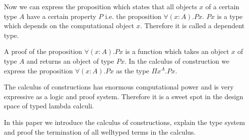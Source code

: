 \begin{enumerate}
Now we can express the proposition which states that all objects $x$ of a
certain type $A$ have a certain property $P$ i.e. the proposition $\forall
(x:A). P x$. $P x$ is a type which depends on the computational object $x$.
Therefore it is called a dependent type.

A proof of the proposition $\forall (x: A). P x$ is a function which takes an
object $x$ of type $A$ and returns an object of type $P x$. In the calculus of
construction we express the proposition $\forall (x: A). P x$ as the type $\Pi
x^A. P x$.
\end{enumerate}


The calculus of constructions has enormous computational power and is very
expressive as a logic and proof system. Therefore it is a sweet spot in the
design space of typed lambda calculi.

In this paper we introduce the calculus of constructions, explain the type
system and proof the termination of all welltyped terms in the calculus.
